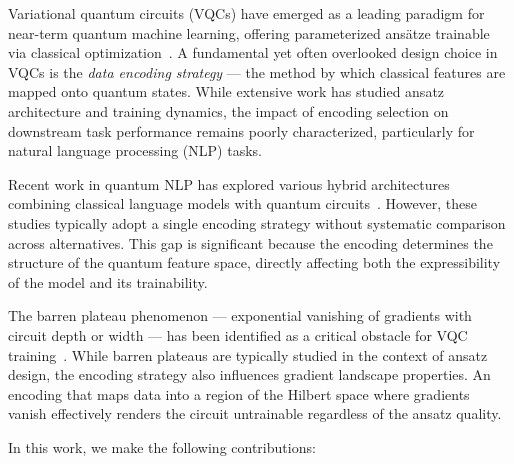 \documentclass[conference,onecolumn,11pt]{IEEEtran}
\begin{document}
Variational quantum circuits (VQCs) have emerged as a leading paradigm for near-term quantum machine learning, offering parameterized ans\"{a}tze trainable via classical optimization~\cite{cerezo2021vqa,bharti2022nisq}. A fundamental yet often overlooked design choice in VQCs is the \emph{data encoding strategy} --- the method by which classical features are mapped onto quantum states. While extensive work has studied ansatz architecture and training dynamics, the impact of encoding selection on downstream task performance remains poorly characterized, particularly for natural language processing (NLP) tasks.

Recent work in quantum NLP has explored various hybrid architectures combining classical language models with quantum circuits~\cite{tomal2025,sasquatch,setfit_pqc,hyqut,gqhan}. However, these studies typically adopt a single encoding strategy without systematic comparison across alternatives. This gap is significant because the encoding determines the structure of the quantum feature space, directly affecting both the expressibility of the model and its trainability.

The barren plateau phenomenon --- exponential vanishing of gradients with circuit depth or width --- has been identified as a critical obstacle for VQC training~\cite{mcclean2018barren,cerezo2021cost}. While barren plateaus are typically studied in the context of ansatz design, the encoding strategy also influences gradient landscape properties. An encoding that maps data into a region of the Hilbert space where gradients vanish effectively renders the circuit untrainable regardless of the ansatz quality.

In this work, we make the following contributions:
\end{document}
